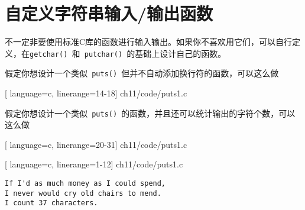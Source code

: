 \section{自定义字符串输入/输出函数}

\begin{frame}[fragile]\ft{\secname} 
不一定非要使用标准C库的函数进行输入输出。如果你不喜欢用它们，可以自行定义，在\lstinline|getchar() |和\lstinline| putchar() |的基础上设计自己的函数。
\end{frame}




\begin{frame}[fragile]\ft{\secname} 
假定你想设计一个类似\lstinline| puts() |但并不自动添加换行符的函数，可以这么做

[
 language=c,
 linerange={14-18}]
{ch11/code/puts1.c}
\end{frame}

\begin{frame}[fragile]\ft{\secname} 
假定你想设计一个类似\lstinline| puts() |的函数，并且还可以统计输出的字符个数，可以这么做

[
 language=c,
 linerange={20-31}]
{ch11/code/puts1.c}
\end{frame}

\begin{frame}[fragile]\ft{\secname} 

[
 language=c,
 linerange={1-12}]
{ch11/code/puts1.c}
\end{frame}

\begin{frame}[fragile]\ft{\secname}
\begin{lstlisting}[backgroundcolor=\color{blue!20}]
If I'd as much money as I could spend,
I never would cry old chairs to mend.
I count 37 characters.
\end{lstlisting}

\end{frame}

